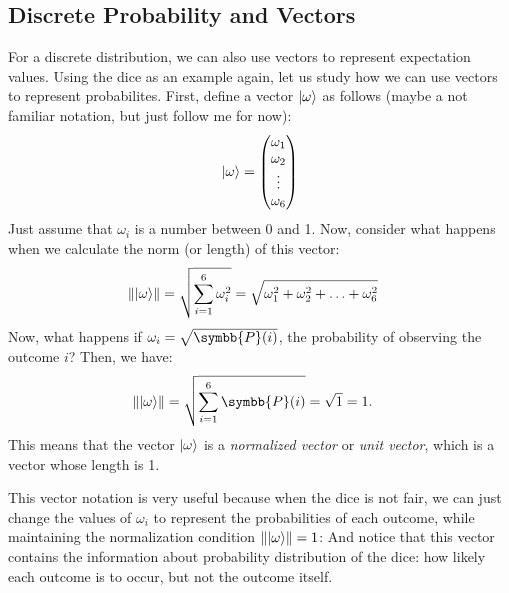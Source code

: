 \subsection{Discrete Probability and Vectors}
For a discrete distribution, we can also use vectors to represent expectation values.
Using the dice as an example again, let us study how we can use vectors to represent probabilites.
First, define a vector $\lvert\omega\rangle$ as follows (maybe a not familiar notation, but just follow me for now):
\begin{align}
  \lvert\omega\rangle = \begin{pmatrix}
                   \omega_1 \\
                   \omega_2 \\
                   \vdots   \\
                   \omega_6
                 \end{pmatrix}
\end{align}
Just assume that $\omega_i$ is a number between 0 and 1.
Now, consider what happens when we calculate the norm (or length) of this vector:
\begin{align}
  \left\lVert \lvert\omega\rangle \right\rVert & = \sqrt{\sum_{i=1}^{6} \omega_i^2} = \sqrt{\omega_1^2 + \omega_2^2 + \ldots + \omega_6^2}
\end{align}
Now, what happens if $\omega_i = \sqrt{\symbb{P}(i)}$, the probability of observing the outcome $i$?
Then, we have:
\begin{align}
  \norm{\ket{\omega}} & = \sqrt{\sum_{i=1}^{6} \symbb{P}(i)} = \sqrt{1} = 1.
\end{align}
This means that the vector $\lvert\omega\rangle$ is a \emph{normalized vector} or \emph{unit vector}, which is a vector whose length is 1.

This vector notation is very useful because when the dice is not fair, we can just change the values of $\omega_i$ to represent the probabilities of each outcome, while maintaining the normalization condition $\left\lVert \lvert\omega\rangle \right\rVert = 1$:
And notice that this vector contains the information about probability distribution of the dice: how likely each outcome is to occur, but not the outcome itself.

